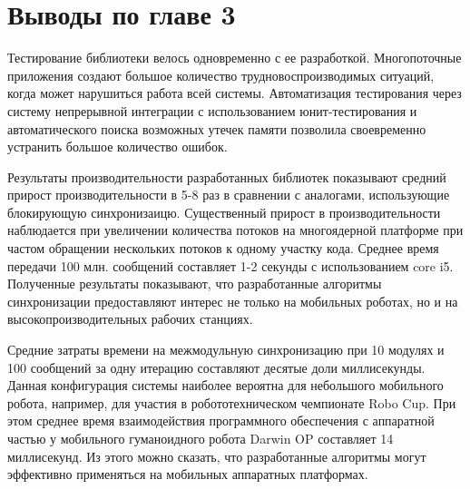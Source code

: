 \section*{Выводы по главе 3}

Тестирование библиотеки велось одновременно с ее разработкой. Многопоточные приложения создают большое количество трудновоспроизводимых ситуаций, когда может нарушиться работа всей системы. Автоматизация тестирования через систему непрерывной интеграции с использованием юнит-тестирования и автоматического поиска возможных утечек памяти позволила своевременно устранить большое количество ошибок.

Результаты производительности разработанных библиотек показывают средний прирост производительности в 5-8 раз в сравнении с аналогами, использующие блокирующую синхронизаицю. Существенный прирост в производительности наблюдается при увеличении количества потоков на многоядерной платформе при частом обращении нескольких потоков к одному участку кода. Среднее время передачи 100 млн. сообщений составляет 1-2 секунды с использованием core i5. Полученные результаты показывают, что разработанные алгоритмы синхронизации предоставляют интерес не только на мобильных роботах, но и на высокопроизводительных рабочих станциях.

Средние затраты времени на межмодульную синхронизацию при 10 модулях и 100 сообщений за одну итерацию составляют десятые доли миллисекунды. Данная конфигурация системы наиболее вероятна для небольшого мобильного робота, например, для участия в робототехническом чемпионате Robo Cup. При этом среднее время взаимодействия программного обеспечения с аппаратной частью у мобильного гуманоидного робота Darwin OP составляет 14 миллисекунд.  Из этого можно сказать, что разработанные алгоритмы могут эффективно применяться на мобильных аппаратных платформах.